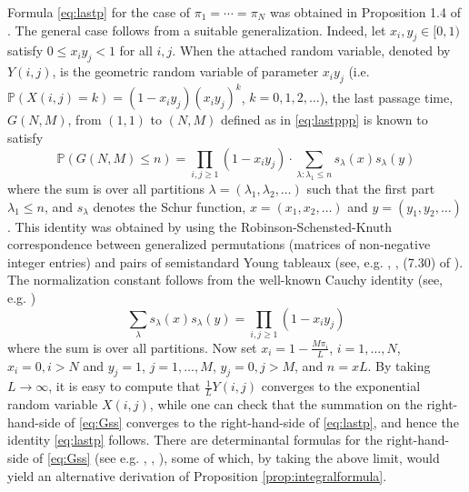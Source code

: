 \documentclass[11pt]{article}
\begin{document}
Formula \eqref{eq:lastp} for the case of $\pi_1=\cdots = \pi_N$
was obtained in Proposition 1.4 of \cite{kurtj:shape}. The general
case follows from a suitable generalization. Indeed, let $x_i,
y_j\in[0,1)$ satisfy $0\le x_iy_j<1$ for all $i,j$. When the
attached random variable, denoted by $Y(i,j)$, is the geometric
random variable of parameter $x_iy_j$ (i.e. $\mathbb{P}(X(i,j)=k)=
(1-x_iy_j)(x_iy_j)^k$, $k=0,1,2,\dots$), the last passage time,
$G(N,M)$, from $(1,1)$ to $(N,M)$ defined as in \eqref{eq:lastppp}
is known to satisfy
\begin{equation}\label{eq:Gss}
  \mathbb{P} ( G(N,M) \le n) = \prod_{i,j\ge 1}(1-x_iy_j) \cdot
  \sum_{\lambda : \lambda_1\le n}
  s_\lambda(x) s_\lambda(y)
\end{equation}
where the sum is over all partitions
$\lambda=(\lambda_1,\lambda_2,\dots)$ such that the first part
$\lambda_1\le n$, and $s_\lambda$ denotes the Schur function,
$x=(x_1,x_2, \dots)$ and $y=(y_1,y_2,\dots)$. This identity was
obtained by using the Robinson-Schensted-Knuth correspondence
between generalized permutations (matrices of non-negative integer
entries) and pairs of semistandard Young tableaux (see, e.g.
\cite{kurtj:shape}, \cite{Okounkov}, (7.30) of \cite{BR1}). The
normalization constant follows from the well-known Cauchy identity
(see, e.g. \cite{Stl})
\begin{equation}
  \sum_{\lambda} s_\lambda(x) s_\lambda(y) = \prod_{i,j\ge 1}
  (1-x_iy_j)
\end{equation}
where the sum is over all partitions.  Now set
$x_i=1-\frac{M\pi_i}{L}$, $i=1,\dots, N$, $x_i=0, i>N$ and
$y_j=1$, $j=1,\dots, M$, $y_j=0, j>M$, and $n=xL$. By taking
$L\to\infty$, it is easy to compute that $\frac1{L} Y(i,j)$
converges to the exponential random variable $X(i,j)$, while one
can check that the summation on the right-hand-side of
\eqref{eq:Gss} converges to the right-hand-side of
\eqref{eq:lastp}, and hence the identity \eqref{eq:lastp} follows.
There are determinantal formulas for the right-hand-side of
\eqref{eq:Gss} (see e.g. \cite{Gessel}, \cite{kurtj:shape},
\cite{Okounkov}), some of which, by taking the above limit, would
yield an alternative derivation of Proposition
\ref{prop:integralformula}.

\bigskip
\end{document}
